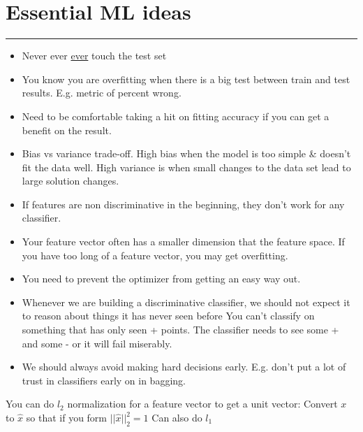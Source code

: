 \section{Essential ML ideas}
\smallskip \hrule height 2pt \smallskip

\begin{itemize}
	\item Never ever \underline{ever} touch the test set
	\item You know you are overfitting when there is a big test between train and test results.  E.g. metric of percent wrong. 
	\item Need to be comfortable taking a hit on fitting accuracy if you can get a benefit on the result.
	\item Bias vs variance trade-off.  
		High bias when the model is too simple \& doesn't fit the data well.  
		High variance is when small changes to the data set lead to large solution changes. 
	\item If features are non discriminative in the beginning, they don't work for any classifier.  %
	\item Your feature vector often has a smaller dimension that the feature space.    %
		If you have too long of a feature vector, you may get overfitting. 
	\item You need to prevent the optimizer from getting an easy way out.  %
	\item Whenever we are building a discriminative classifier, 
        		we should not expect it to reason about things it has never seen before
    		You can't classify on something that has only seen + points. 
    		The classifier needs to see some + and some - or it will fail miserably.   %
	\item We should always avoid making hard decisions early.  %
		 E.g. don't put a lot of trust in classifiers early on in bagging. 
\end{itemize}

You can do $l_2$ normalization for a feature vector to get a unit vector:   %
	Convert $x$ to $\hat{x}$ so that if you form $||\hat{x}||_2^2 = 1$
	Can also do $l_1$  
